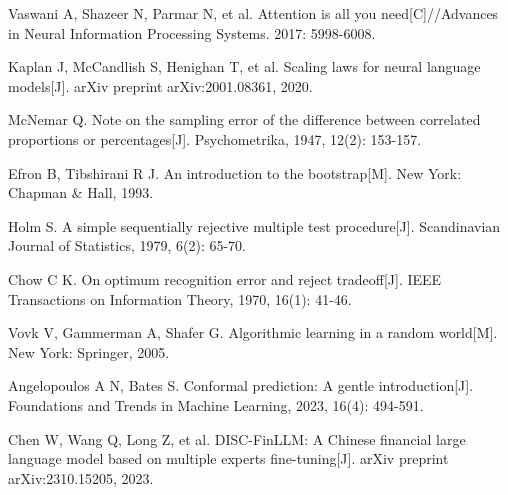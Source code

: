  Vaswani A, Shazeer N, Parmar N, et al. Attention is all you need[C]/\allowbreak{}/\allowbreak{}Advances in Neural Information Processing Systems. 2017: 5998-\allowbreak{}6008.

 Kaplan J, McCandlish S, Henighan T, et al. Scaling laws for neural language models[J]. arXiv preprint arXiv:2001.08361, 2020.

 McNemar Q. Note on the sampling error of the difference between correlated proportions or percentages[J]. Psychometrika, 1947, 12(2): 153-\allowbreak{}157.

 Efron B, Tibshirani R J. An introduction to the bootstrap[M]. New York: Chapman \& Hall, 1993.

 Holm S. A simple sequentially rejective multiple test procedure[J]. Scandinavian Journal of Statistics, 1979, 6(2): 65-\allowbreak{}70.

 Chow C K. On optimum recognition error and reject tradeoff[J]. IEEE Transactions on Information Theory, 1970, 16(1): 41-\allowbreak{}46.

 Vovk V, Gammerman A, Shafer G. Algorithmic learning in a random world[M]. New York: Springer, 2005.

 Angelopoulos A N, Bates S. Conformal prediction: A gentle introduction[J]. Foundations and Trends in Machine Learning, 2023, 16(4): 494-\allowbreak{}591.

 Chen W, Wang Q, Long Z, et al. DISC-\allowbreak{}FinLLM: A Chinese financial large language model based on multiple experts fine-\allowbreak{}tuning[J]. arXiv preprint arXiv:2310.15205, 2023.
